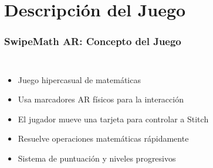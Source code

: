 \documentclass{beamer}
\begin{document}
\section{Descripción del Juego}

\begin{frame}
\frametitle{SwipeMath AR: Concepto del Juego}
\begin{columns}
\begin{itemize}
    \item<1-> Juego hipercasual de matemáticas
    \item<2-> Usa marcadores AR físicos para la interacción
    \item<3-> El jugador mueve una tarjeta para controlar a Stitch
    \item<4-> Resuelve operaciones matemáticas rápidamente
    \item<5-> Sistema de puntuación y niveles progresivos
\end{itemize}

\end{columns}
\end{frame}
\end{document}
